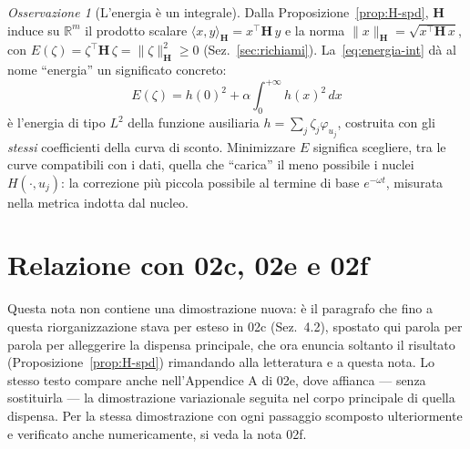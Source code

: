 \documentclass[11pt,a4paper]{article}
\theoremstyle{plain}
\theoremstyle{definition}
\theoremstyle{remark}
\newtheorem*{osservazione}{Osservazione}
\newcommand{\Hmat}{\mathbf{H}}
\newcommand{\transp}{^{\!\top}}
\begin{document}
\begin{osservazione}[L'energia \`e un integrale]
\label{oss:energia}
Dalla Proposizione~\ref{prop:H-spd}, $\Hmat$ induce su $\mathbb{R}^m$ il prodotto scalare
$\langle x,y\rangle_{\Hmat} = x\transp\Hmat\,y$ e la norma
$\|x\|_{\Hmat} = \sqrt{x\transp\Hmat\,x}$, con $E(\zeta) = \zeta\transp \Hmat\, \zeta =
\|\zeta\|_{\Hmat}^2 \ge 0$ (Sez.~\ref{sec:richiami}). La~\eqref{eq:energia-int} d\`a al nome
``energia'' un significato concreto:
\[
  E(\zeta) = h(0)^2 + \alpha\!\int_0^{+\infty}\! h(x)^2\,dx
\]
\`e l'energia di tipo $L^2$ della funzione ausiliaria $h=\sum_j\zeta_j\varphi_{u_j}$,
costruita con gli \emph{stessi} coefficienti della curva di sconto. Minimizzare $E$ significa
scegliere, tra le curve compatibili con i dati, quella che ``carica'' il meno possibile i
nuclei $H(\cdot,u_j)$: la correzione pi\`u piccola possibile al termine di base $e^{-\omega t}$,
misurata nella metrica indotta dal nucleo.
\end{osservazione}

\section{Relazione con 02c, 02e e 02f}
\label{sec:confronto}

Questa nota non contiene una dimostrazione nuova: \`e il paragrafo che fino a questa
riorganizzazione stava per esteso in 02c (Sez.~4.2), spostato qui parola per parola per
alleggerire la dispensa principale, che ora enuncia soltanto il risultato
(Proposizione~\ref{prop:H-spd}) rimandando alla letteratura e a questa nota. Lo stesso testo
compare anche nell'Appendice A di 02e, dove affianca --- senza sostituirla --- la
dimostrazione variazionale seguita nel corpo principale di quella dispensa. Per la stessa
dimostrazione con ogni passaggio scomposto ulteriormente e verificato anche numericamente, si
veda la nota 02f.
\end{document}

